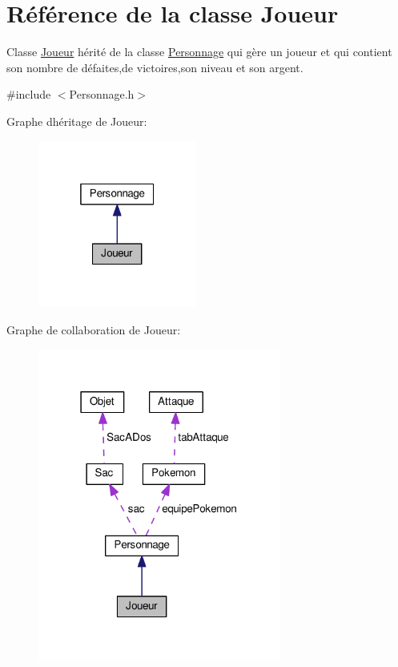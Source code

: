 \hypertarget{class_joueur}{}\section{Référence de la classe Joueur}
\label{class_joueur}


Classe \hyperlink{class_joueur}{Joueur} hérité de la classe \hyperlink{class_personnage}{Personnage} qui gère un joueur et qui contient son nombre de défaites,de victoires,son niveau et son argent.  




{\ttfamily \#include $<$Personnage.\+h$>$}



Graphe d\textquotesingle{}héritage de Joueur\+:\nopagebreak
\begin{figure}[H]
\begin{center}
\leavevmode
\includegraphics[width=148pt]{class_joueur__inherit__graph}
\end{center}
\end{figure}


Graphe de collaboration de Joueur\+:\nopagebreak
\begin{figure}[H]
\begin{center}
\leavevmode
\includegraphics[width=226pt]{class_joueur__coll__graph}
\end{center}
\end{figure}
